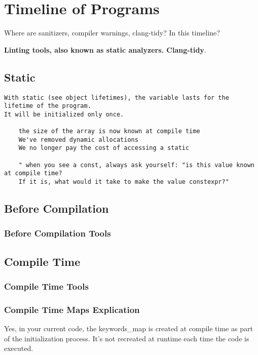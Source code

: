 \chapter{Timeline of Programs}

Where are sanitizers, compiler warnings, clang-tidy? In this timeline?


\textbf{Linting tools, also known as static analyzers. Clang-tidy}.


\section{Static}

\begin{verbatim}
With static (see object lifetimes), the variable lasts for the lifetime of the program.
It will be initialized only once. 

    the size of the array is now known at compile time
    We've removed dynamic allocations
    We no longer pay the cost of accessing a static

    " when you see a const, always ask yourself: "is this value known at compile time? 
    If it is, what would it take to make the value constexpr?" 
\end{verbatim}

\section{Before Compilation}

\subsection{Before Compilation Tools}


\section{Compile Time}

\subsection{Compile Time Tools}


\subsection{Compile Time Maps Explication}

Yes, in your current code,
the keywords_map is created at compile time as part of the initialization process.
It's not recreated at runtime each time the code is executed.


